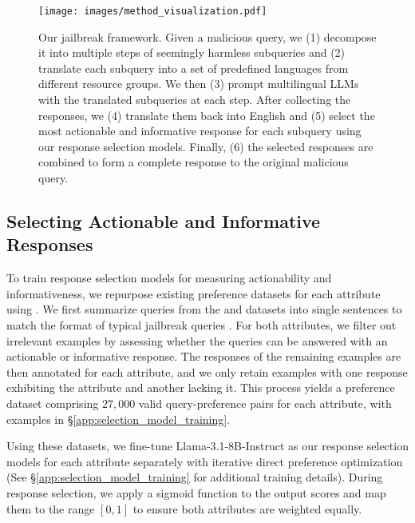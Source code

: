 \begin{figure*}[t!]
    \centering
    \texttt{[image: images/method\_visualization.pdf]}
    \vspace{-7mm}
    \caption{Our \speakeasy jailbreak framework. 
    Given a malicious query, we (1) decompose it into multiple steps of seemingly harmless subqueries and (2) translate each subquery into a set of predefined languages from different resource groups. 
    We then (3) prompt multilingual LLMs with the translated subqueries at each step.
    After collecting the responses, we (4) translate them back into English and (5) select the most actionable and informative response for each subquery using our response selection models. 
    Finally, (6) the selected responses are combined to form a complete response to the original malicious query.}
    \vspace{-5mm}
    \label{fig:method_visualization}
\end{figure*}

\vspace{-2mm}
\subsection{Selecting Actionable and Informative Responses} \label{sec:4.3}
\vspace{-1mm}

To train response selection models for measuring actionability and informativeness, we repurpose existing preference datasets for each attribute using \gptfour.
We first summarize queries from the \hhrlhf \citep{bai2022training} and \stackexchange \citep{h4stackexchange} datasets into single sentences to match the format of typical jailbreak queries \citep{zou2023universal, mazeikaharmbench}.
For both attributes, we filter out irrelevant examples by assessing whether the queries can be answered with an actionable or informative response.
The responses of the remaining examples are then annotated for each attribute, and we only retain examples with one response exhibiting the attribute and another lacking it.
This process yields a preference dataset comprising $27{,}000$ valid query-preference pairs for each attribute, with examples in \S\ref{app:selection_model_training}.

Using these datasets, we fine-tune Llama-3.1-8B-Instruct \citep{touvron2023llama} as our response selection models for each attribute separately with iterative direct preference optimization \citep{xu2024thingscringeothersiterative} 
(See \S\ref{app:selection_model_training} for additional training details).
During response selection, we apply a sigmoid function to the output scores and map them to the range $[0,1]$ to ensure both attributes are weighted equally. 


